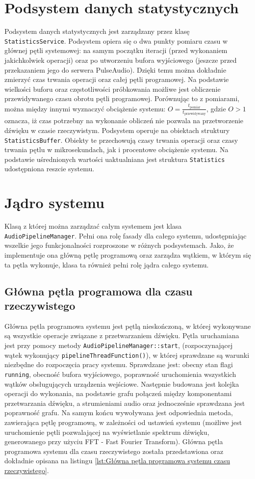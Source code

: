 \section{Podsystem danych statystycznych}
Podsystem danych statystycznych jest zarządzany przez klasę \texttt{StatisticsService}. Podsystem opiera się o dwa punkty pomiaru czasu w głównej pętli systemowej: na samym początku iteracji (przed wykonaniem jakichkolwiek operacji) oraz po utworzeniu bufora wyjściowego (jeszcze przed przekazaniem jego do serwera PulseAudio\cite{bib:PulseAudio}). Dzięki temu można dokładnie zmierzyć czas trwania operacji oraz całej pętli programowej. Na podstawie wielkości buforu oraz częstotliwości próbkowania możliwe jest obliczenie przewidywanego czasu obrotu pętli programowej. Porównując to z pomiarami, można między innymi wyznaczyć obciążenie systemu: $O = \frac{t_{\text{pomiar}}}{t_{\text{przewidywany}}}$, gdzie $O > 1$ oznacza, iż czas potrzebny na wykonanie obliczeń nie pozwala na przetworzenie dźwięku w czasie rzeczywistym. Podsystem operuje na obiektach struktury \texttt{StatisticsBuffer}. Obiekty te przechowują czasy trwania operacji oraz czasy trwania pętlu w mikrosekundach, jak i procentowe obciążenie systemu. Na podstawie uśrednionych wartości uaktualniana jest struktura \texttt{Statistics} udostępniona reszcie systemu.

\section{Jądro systemu}
Klasą z której można zarządzać całym systemem jest klasa \texttt{AudioPipelineManager}. Pełni ona rolę fasady dla całego systemu, udostępniając wszelkie jego funkcjonalności rozproszone w różnych podsystemach. Jako, że implementuje ona główną pętlę programową oraz zarządza wątkiem, w którym się ta pętla wykonuje, klasa ta również pełni rolę jądra całego systemu. 

\subsection{Główna pętla programowa dla czasu rzeczywistego}
Główna pętla programowa systemu jest pętlą nieskończoną, w której wykonywane są wszystkie operacje związane z przetwarzaniem dźwięku. Pętla uruchamiana jest przy pomocy metody \texttt{AudioPipelineManager::start}, (rozpoczynającej wątek wykonujący \texttt{pipelineThreadFunction()}), w której sprawdzane są warunki niezbędne do rozpoczęcia pracy systemu. Sprawdzane jest: obecny stan flagi \texttt{running}, obecność bufora wyjściowego, poprawność uruchomienia wszystkich wątków obsługujących urządzenia wejściowe. Następnie budowana jest kolejka operacji do wykonania, na podstawie grafu połączeń między komponentami przetwarzania dźwięku, a strumieniami audio oraz jednocześnie sprawdzana jest poprawność grafu. Na samym końcu wywoływana jest odpowiednia metoda, zawierająca pętlę programową, w zależności od ustawień systemu (możliwe jest uruchomienie pętli pozwalającej na wyświetlanie spektrum dźwięku, generowanego przy użyciu FFT - Fast Fourier Transform). Główna pętla programowa systemu dla czasu rzeczywistego została przedstawiona oraz dokładnie opisana na listingu \ref{lst:Główna pętla programowa systemu czasu rzeczywistego}. 

